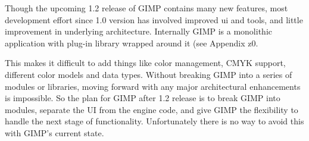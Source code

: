 
Though the upcoming 1.2 release of GIMP contains many new features, most
development effort since 1.0 version has involved improved ui and tools, and
little improvement in underlying architecture.  Internally GIMP is a monolithic
application with plug-in library wrapped around it (see Appendix  z0.

This makes it difficult to add things like color management, CMYK support,
different color models and data types. Without breaking GIMP into a series of
modules or libraries, moving forward with any major architectural enhancements
is impossible. So the plan for GIMP after 1.2 release is to break GIMP into
modules, separate the UI from the engine code, and give GIMP the flexibility to
handle the next stage of functionality. Unfortunately there is no way to avoid
this with GIMP's current state.
